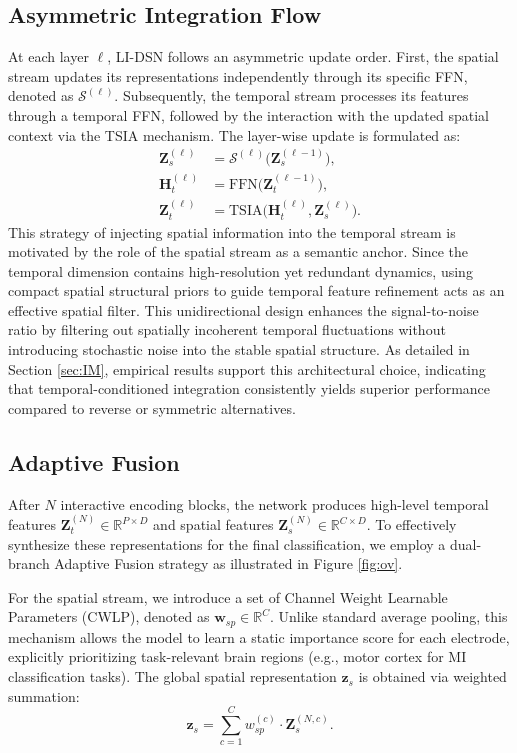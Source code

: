 \documentclass[journal]{IEEEtran}
\theoremstyle{plain}
\begin{document}
\subsection{Asymmetric Integration Flow}
At each layer $\ell$, LI-DSN follows an asymmetric update order. First, the spatial stream updates its representations independently through its specific FFN, denoted as $\mathcal{S}^{(\ell)}$. Subsequently, the temporal stream processes its features through a temporal FFN, followed by the interaction with the updated spatial context via the TSIA mechanism. The layer-wise update is formulated as:
\begin{equation}
\begin{aligned}
\mathbf{Z}_s^{(\ell)} &= \mathcal{S}^{(\ell)}\big(\mathbf{Z}_s^{(\ell-1)}\big), \\
\mathbf{H}_t^{(\ell)} &= \text{FFN}\big(\mathbf{Z}_t^{(\ell-1)}\big), \\
\mathbf{Z}_t^{(\ell)} &= \text{TSIA}\big(\mathbf{H}_t^{(\ell)}, \mathbf{Z}_s^{(\ell)}\big).
\end{aligned}
\label{eq:asymmetric_flow}
\end{equation}
This strategy of injecting spatial information into the temporal stream is motivated by the role of the spatial stream as a semantic anchor. Since the temporal dimension contains high-resolution yet redundant dynamics, using compact spatial structural priors to guide temporal feature refinement acts as an effective spatial filter. This unidirectional design enhances the signal-to-noise ratio by filtering out spatially incoherent temporal fluctuations without introducing stochastic noise into the stable spatial structure. As detailed in Section \ref{sec:IM}, empirical results support this architectural choice, indicating that temporal-conditioned integration consistently yields superior performance compared to reverse or symmetric alternatives.

\subsection{Adaptive Fusion}
After $N$ interactive encoding blocks, the network produces high-level temporal features $\mathbf{Z}_t^{(N)} \in \mathbb{R}^{P \times D}$ and spatial features $\mathbf{Z}_s^{(N)} \in \mathbb{R}^{C \times D}$. To effectively synthesize these representations for the final classification, we employ a dual-branch Adaptive Fusion strategy as illustrated in Figure \ref{fig:ov}.

For the spatial stream, we introduce a set of Channel Weight Learnable Parameters (CWLP), denoted as $\mathbf{w}_{sp} \in \mathbb{R}^C$. Unlike standard average pooling, this mechanism allows the model to learn a static importance score for each electrode, explicitly prioritizing task-relevant brain regions (e.g., motor cortex for MI classification tasks). The global spatial representation $\mathbf{z}_{s}$ is obtained via weighted summation:
\begin{equation}
\mathbf{z}_{s} = \sum_{c=1}^{C} w_{sp}^{(c)} \cdot \mathbf{Z}_s^{(N, c)}.
\label{eq:spatial_fusion}
\end{equation}
\end{document}

